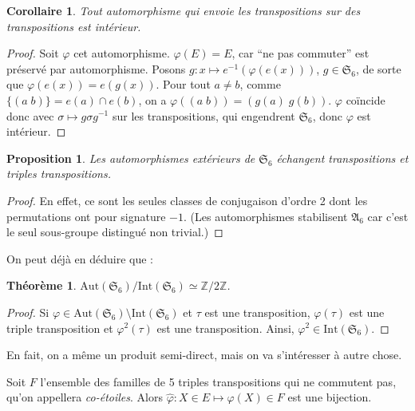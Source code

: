 \documentclass[a4paper, 11pt]{article}
\def\Z{\mathbb{Z}}
\def\Sigmap{\mathfrak{S}}
\def\Aut{\mathrm{Aut}}
\newtheorem*{proposition}{Proposition}
\newtheorem*{theorem}{Théorème}
\newtheorem*{corollary}{Corollaire}
\begin{document}
\begin{corollary}
  Tout automorphisme qui envoie les transpositions sur des transpositions est
  intérieur.
\end{corollary}
\begin{proof}
  Soit $\varphi$ cet automorphisme. $\varphi(E) = E$, car \enquote{ne pas commuter}
  est préservé par automorphisme. Posons $g : x \mapsto e^{-1}(\varphi(e(x)))$, $g
  \in \Sigmap_6$, de sorte que $\varphi(e(x)) = e(g(x))$. Pour tout $a \neq b$,
  comme $\{(a\;b)\} = e(a) \cap e(b)$, on a $\varphi((a\;b)) = (g(a)\;g(b))$.
  $\varphi$ coïncide donc avec $\sigma \mapsto g\sigma g^{-1}$ sur les
  transpositions, qui engendrent $\Sigmap_6$, donc $\varphi$ est intérieur.
\end{proof}

\begin{proposition}
  Les automorphismes extérieurs de $\Sigmap_6$ échangent transpositions et
  triples transpositions.
\end{proposition}
\begin{proof}
  En effet, ce sont les seules classes de conjugaison d'ordre 2 dont les
  permutations ont pour signature $-1$. (Les automorphismes stabilisent
  $\mathfrak{A}_6$ car c'est le seul sous-groupe distingué non trivial.)
\end{proof}

On peut déjà en déduire que :

\begin{theorem}
  $\Aut(\Sigmap_6)/\mathrm{Int}(\Sigmap_6) \simeq \Z/2\Z$.
\end{theorem}
\begin{proof}
  Si $\varphi \in \Aut(\Sigmap_6) \setminus \mathrm{Int}(\Sigmap_6)$ et
  $\tau$ est une transposition, $\varphi(\tau)$ est une triple transposition et
  $\varphi^2(\tau)$ est une transposition. Ainsi, $\varphi^2 \in
  \mathrm{Int}(\Sigmap_6)$.
\end{proof}

En fait, on a même un produit semi-direct, mais on va s'intéresser à autre
chose.

Soit $F$ l'ensemble des familles de 5 triples transpositions qui ne commutent
pas, qu'on appellera \emph{co-étoiles}. Alors $\widehat{\varphi} : X \in E \mapsto
\varphi(X) \in F$ est une bijection.
\end{document}
